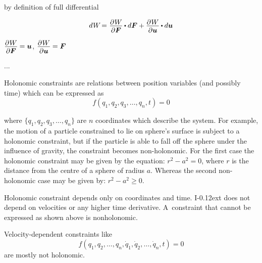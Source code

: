 by definition of full differential

\nopagebreak\[
d \hspace{.1ex} W \hspace{-0.33ex}  = \hspace{.08ex} \displaystyle \frac{\raisemath{-0.2em}{\partial \hspace{.1ex} W}}{\partial \bm{F}} \hspace{-0.1ex} \dotp d \bm{F} + \frac{\raisemath{-0.2em}{\partial \hspace{.1ex} W}}{\partial \bm{u}} \hspace{-0.1ex} \dotp d \bm{u}
\]

${\displaystyle \frac{\raisemath{-0.2em}{\partial \hspace{.1ex} W}}{\partial \bm{F}} \hspace{-0.1ex} = \bm{u}}$,
${\displaystyle \frac{\raisemath{-0.2em}{\partial \hspace{.1ex} W}}{\partial \bm{u}} \hspace{-0.1ex} = \bm{F}}$

...

{\small\setlength{\abovedisplayskip}{2pt}\setlength{\belowdisplayskip}{2pt}

Holonomic constraints are relations between position variables (and possibly time) which can be expressed as
\[ f(q_{1}, q_{2}, q_{3}, \ldots, q_{n}, t) = 0 \]

\noindent where ${\{q_{1},q_{2},q_{3},\ldots,q_{n}\}}$ are $n$ coordinates which describe the system. For example, the motion of a particle constrained to lie on sphere’s surface is subject to a holonomic constraint, but if the particle is able to fall off the sphere under the influence of gravity, the constraint becomes non-holonomic. For the first case the holonomic constraint may be given by the equation: ${r^{2} - a^{2} = 0}$, where $r$ is the distance from the centre of a sphere of radius $a$. Whereas the second non-holonomic case may be given by: ${r^{2} - a^{2} \geq 0}$.

Holonomic constraint depends only on coordinates and time. I\kern-0.12ext does not depend on velocities or any higher time derivative. A~constraint that cannot be expressed as shown above is nonholonomic.

Velocity-dependent constraints like
\[ \displaystyle f(q_{1}, q_{2}, \ldots, q_{n}, {\dot {q}}_{1}, {\dot {q}}_{2}, \ldots, {\dot {q}}_{n}, t) = 0 \]
are mostly not holonomic.
\par}



